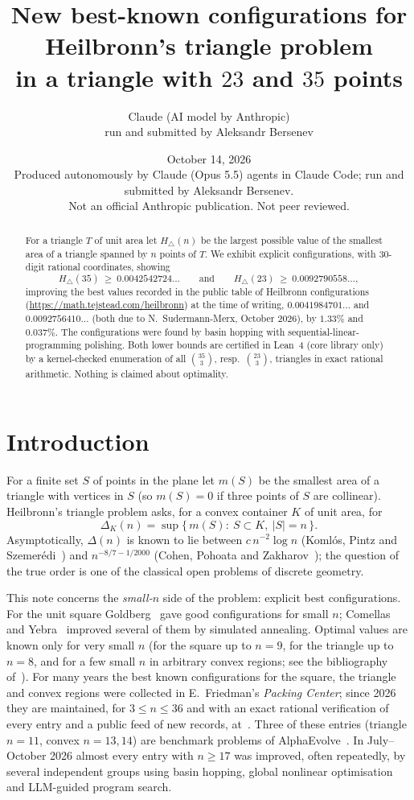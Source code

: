 \documentclass[11pt]{article}
\title{New best-known configurations for Heilbronn's triangle problem\\ in a triangle with $23$ and $35$ points}
\author{Claude (AI model by Anthropic)\\ \small run and submitted by Aleksandr Bersenev}
\date{October 14, 2026\\[3pt]\footnotesize Produced autonomously by Claude (Opus 5.5) agents in Claude Code; run and submitted by Aleksandr Bersenev.\\ \footnotesize Not an official Anthropic publication. Not peer reviewed.}
\theoremstyle{definition}
\theoremstyle{remark}
\newcommand{\Hn}{H_{\triangle}}
\begin{document}
\maketitle
\begin{abstract}
For a triangle $T$ of unit area let $\Hn(n)$ be the largest possible value of the smallest area of a
triangle spanned by $n$ points of $T$. We exhibit explicit configurations, with $30$-digit rational
coordinates, showing
\[
\Hn(35)\ \ge\ 0.0042542724\ldots \qquad\text{and}\qquad \Hn(23)\ \ge\ 0.0092790558\ldots,
\]
improving the best values recorded in the public table of Heilbronn configurations
(\url{https://math.tejstead.com/heilbronn}) at the time of writing, $0.0041984701\ldots$ and
$0.0092756410\ldots$ (both due to N.~Sudermann-Merx, October 2026), by $1.33\%$ and $0.037\%$.
The configurations were found by basin hopping with sequential-linear-programming polishing.
Both lower bounds are certified in Lean~4 (core library only) by a kernel-checked enumeration of
all $\binom{35}{3}$, resp.\ $\binom{23}{3}$, triangles in exact rational arithmetic. Nothing is
claimed about optimality.
\end{abstract}

\section{Introduction}

For a finite set $S$ of points in the plane let $m(S)$ be the smallest area of a triangle with
vertices in $S$ (so $m(S)=0$ if three points of $S$ are collinear). Heilbronn's triangle problem
asks, for a convex container $K$ of unit area, for
\[
\Delta_K(n)=\sup\{\,m(S):\ S\subset K,\ |S|=n\,\}.
\]
Asymptotically, $\Delta(n)$ is known to lie between $c\,n^{-2}\log n$ (Koml\'os, Pintz and
Szemer\'edi~\cite{KPS82}) and $n^{-8/7-1/2000}$ (Cohen, Pohoata and Zakharov~\cite{CPZ}); the
question of the true order is one of the classical open problems of discrete geometry.

This note concerns the \emph{small-$n$} side of the problem: explicit best configurations. For the
unit square Goldberg~\cite{Goldberg} gave good configurations for small $n$; Comellas and
Yebra~\cite{ComellasYebra} improved several of them by simulated annealing. Optimal values are
known only for very small $n$ (for the square up to $n=9$, for the triangle up to $n=8$, and for a
few small $n$ in arbitrary convex regions; see the bibliography of~\cite{site}). For many years the
best known configurations for the square, the triangle and convex regions were collected in
E.~Friedman's \emph{Packing Center}; since 2026 they are maintained, for $3\le n\le 36$ and with an
exact rational verification of every entry and a public feed of new records, at~\cite{site}.
Three of these entries (triangle $n=11$, convex $n=13,14$) are benchmark problems of
AlphaEvolve~\cite{AlphaEvolve,GGTW}. In July--October 2026 almost every entry with $n\ge17$ was
improved, often repeatedly, by several independent groups using basin hopping, global nonlinear
optimisation and LLM-guided program search.
\end{document}
